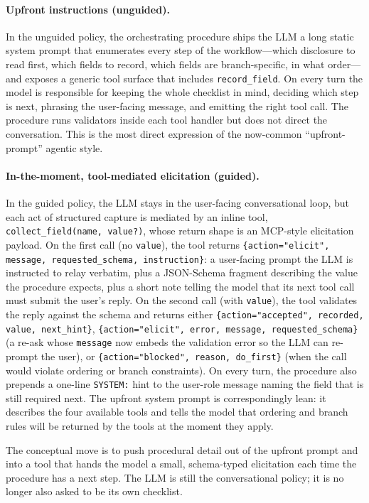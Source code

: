 \documentclass[11pt,a4paper]{article}
\begin{document}
\paragraph{Upfront instructions (unguided).}
In the unguided policy, the orchestrating procedure ships the LLM a long static system prompt that enumerates every step of the workflow---which disclosure to read first, which fields to record, which fields are branch-specific, in what order---and exposes a generic tool surface that includes \texttt{record\_field}. On every turn the model is responsible for keeping the whole checklist in mind, deciding which step is next, phrasing the user-facing message, and emitting the right tool call. The procedure runs validators inside each tool handler but does not direct the conversation. This is the most direct expression of the now-common ``upfront-prompt'' agentic style.

\paragraph{In-the-moment, tool-mediated elicitation (guided).}
In the guided policy, the LLM stays in the user-facing conversational loop, but each act of structured capture is mediated by an inline tool, \texttt{collect\_field(name, value?)}, whose return shape is an MCP-style elicitation payload. On the first call (no \texttt{value}), the tool returns \texttt{\{action="elicit", message, requested\_schema, instruction\}}: a user-facing prompt the LLM is instructed to relay verbatim, plus a JSON-Schema fragment describing the value the procedure expects, plus a short note telling the model that its next tool call must submit the user's reply. On the second call (with \texttt{value}), the tool validates the reply against the schema and returns either \texttt{\{action="accepted", recorded, value, next\_hint\}}, \texttt{\{action="elicit", error, message, requested\_schema\}} (a re-ask whose \texttt{message} now embeds the validation error so the LLM can re-prompt the user), or \texttt{\{action="blocked", reason, do\_first\}} (when the call would violate ordering or branch constraints). On every turn, the procedure also prepends a one-line \texttt{SYSTEM:} hint to the user-role message naming the field that is still required next. The upfront system prompt is correspondingly lean: it describes the four available tools and tells the model that ordering and branch rules will be returned by the tools at the moment they apply.

The conceptual move is to push procedural detail out of the upfront prompt and into a tool that hands the model a small, schema-typed elicitation each time the procedure has a next step. The LLM is still the conversational policy; it is no longer also asked to be its own checklist.
\end{document}
